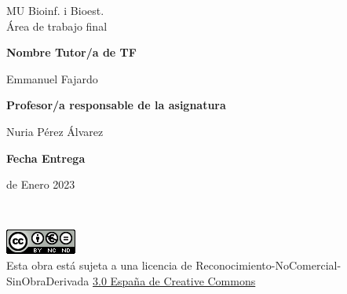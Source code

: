 \documentclass[a4paper,12pt]{article}
\newcommand{\thissupervisor}{Emmanuel Fajardo}
\newcommand{\thisPRA}{Nuria Pérez Álvarez}
\newcommand{\duedate}{15 de Enero 2023}
\begin{document}
\begin{minipage}{\paperwidth}
\begin{minipage}{0.45\paperwidth}
        {\fontsize{24pt}{1cm}\selectfont MU Bioinf. i Bioest.\\
        Área de trabajo final}\\
        
        \vspace{0.5cm}
        
        \fontsize{24pt}{1cm}\textbf{Nombre Tutor/a de TF}\\

        \vspace{0.1cm}

        {\fontsize{21pt}{1cm}\selectfont \thissupervisor}\\

        \vspace{0.1cm}

        \fontsize{24pt}{1cm}\textbf{Profesor/a responsable de la asignatura}\\

        \vspace{0.1cm}

        {\fontsize{21pt}{1cm}\selectfont \thisPRA}\\

        \vspace{0.5cm}

        \fontsize{21pt}{1cm}\textbf{Fecha Entrega}\\

        \vspace{0.5cm}

        {\fontsize{21pt}{1cm}\selectfont \duedate}

        \vspace{2cm}
    \end{minipage}
\end{minipage}

\pagebreak


\restoregeometry

\thispagestyle{UOCfooterpage}
~
\vfill
\begin{minipage}[l]{0.4\paperwidth}
    \includegraphics{assets/license.png}\\
    Esta obra está sujeta a una licencia de Reconocimiento-NoComercial-SinObraDerivada \href{http://creativecommons.org/licenses/by-nc-nd/3.0/es/
        }{3.0 España de Creative Commons}    
\end{minipage}
\pagebreak
\end{document}
